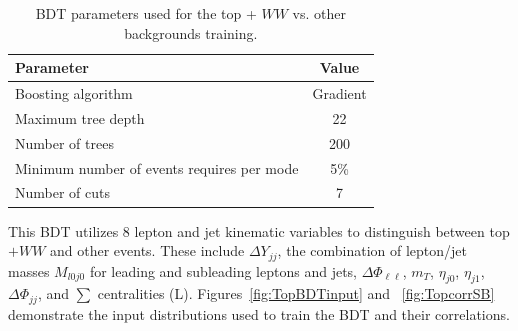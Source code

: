 \begin{table}[h!]
\centering
\begin{tabular}{|l|c|}
\hline
Parameter                                    & Value     \\
\hline
Boosting algorithm                           &  Gradient  \\
Maximum tree depth                           &  22       \\
Number of trees                              &  200     \\
Minimum number of events requires per mode   &  5\%      \\
Number of cuts                               &  7        \\
\hline
\end{tabular}
\caption{BDT parameters used for the top + $WW$ vs. other backgrounds training.} 
\label{tab:TopBDTparameters}
\end{table}

This BDT utilizes 8 lepton and jet kinematic variables to distinguish between top$+WW$ and other events. These include $\Delta Y_{jj}$, the combination of lepton/jet masses $M_{l0j0}$ for leading and subleading leptons and jets, $\Delta \Phi_{\ell\ell}$, $m_T$, $\eta_{j0}$, $\eta_{j1}$, $\Delta \Phi_{jj}$, and $\sum$ centralities (L). Figures~\ref{fig:TopBDTinput} and ~\ref{fig:TopcorrSB} demonstrate the input distributions used to train the BDT and their correlations.

